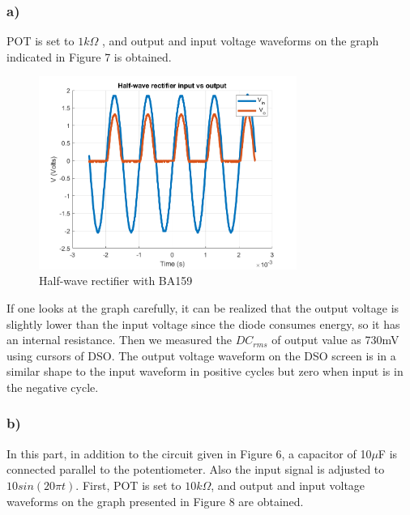 \documentclass[letterpaper,12pt]{article}
\begin{document}
\subsubsection{a)}

POT is set to \(1k\Omega\) , and output and input voltage waveforms on the graph indicated in Figure 7 is obtained.

\begin{figure}[H]
    \centering
    \includegraphics[width = 0.75\textwidth]{2_a.png}
    \caption{Half-wave rectifier with BA159}
\end{figure} 



If one looks at the graph carefully, it can be realized that the output voltage is slightly lower than the input voltage since the diode consumes energy, so it has an internal resistance. Then we measured the \(DC_{rms} \) of output value as 730mV using cursors of DSO. The output voltage waveform on the DSO screen is in a similar shape to the input waveform in positive cycles but zero when input is in the negative cycle.  


\subsubsection{b)}
In this part, in addition to the circuit given in Figure 6, a capacitor of 10\(\mu\)F is connected parallel to the potentiometer. Also the input signal is adjusted to \(10 sin(20 \pi t) \). First, POT is set to \(10k\Omega\), and output and input voltage waveforms on the graph presented in Figure 8 are obtained.
\end{document}
